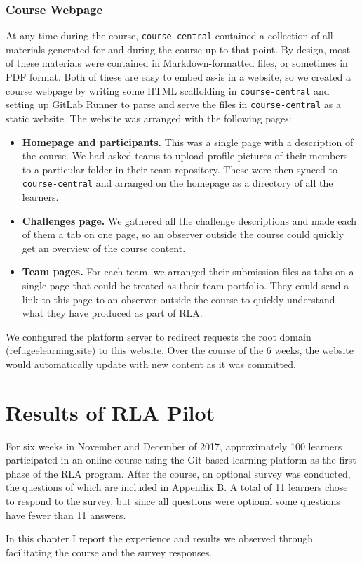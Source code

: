 \documentclass[12pt,twoside]{mitthesis}
\newcommand{\review}[1]{{\color{mygreen} #1}}
\begin{document}
\subsection{Course Webpage}

\review{At any time during the course, \texttt{course-central} contained a collection of all materials generated for and during the course up to that point. By design, most of these materials were contained in Markdown-formatted files, or sometimes in PDF format. Both of these are easy to embed as-is in a website, so we created a course webpage by writing some HTML scaffolding in \texttt{course-central} and setting up GitLab Runner to parse and serve the files in \texttt{course-central} as a static website. The website was arranged with the following pages:
\begin{itemize}
\item \textbf{Homepage and participants.} This was a single page with a description of the course. We had asked teams to upload profile pictures of their members to a particular folder in their team repository. These were then synced to \texttt{course-central} and arranged on the homepage as a directory of all the learners.
\item \textbf{Challenges page.} We gathered all the challenge descriptions and made each of them a tab on one page, so an observer outside the course could quickly get an overview of the course content.
\item \textbf{Team pages.} For each team, we arranged their submission files as tabs on a single page that could be treated as their team portfolio. They could send a link to this page to an observer outside the course to quickly understand what they have produced as part of RLA.
\end{itemize}
We configured the platform server to redirect requests the root domain (refugeelearning.site) to this website. Over the course of the 6 weeks, the website would automatically update with new content as it was committed.
}

\chapter{Results of RLA Pilot}

\review{For six weeks in November and December of 2017, approximately 100 learners participated in an online course using the Git-based learning platform as the first phase of the RLA program. After the course, an optional survey was conducted, the questions of which are included in Appendix B. A total of 11 learners chose to respond to the survey, but since all questions were optional some questions have fewer than 11 answers.

In this chapter I report the experience and results we observed through facilitating the course and the survey responses.}
\end{document}

